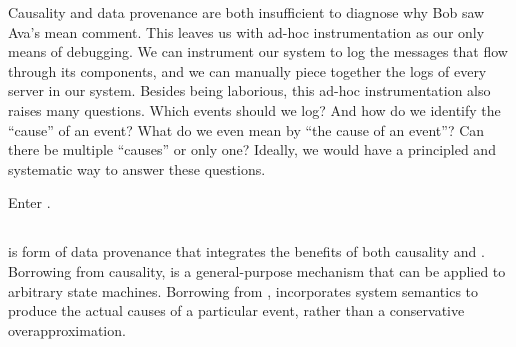 Causality and data provenance are both insufficient to diagnose why Bob saw
Ava's mean comment. This leaves us with ad-hoc instrumentation as our only
means of debugging. We can instrument our system to log the messages that flow
through its components, and we can manually piece together the logs of every
server in our system. Besides being laborious, this ad-hoc instrumentation also
raises many questions. Which events should we log? And how do we identify the
``cause'' of an event? What do we even mean by ``the cause of an event''? Can
there be multiple ``causes'' or only one? Ideally, we would have a principled
and systematic way to answer these questions.

Enter \watprovenance{}. 

%

\subsection{\WatProvenance{}}
\Watprovenance{} is form of data provenance that integrates the benefits of
both causality and \whyprovenance{}. Borrowing from causality, \watprovenance{}
is a general-purpose mechanism that can be applied to arbitrary state machines.
Borrowing from \whyprovenance{}, \watprovenance{} incorporates system semantics
to produce the actual causes of a particular event, rather than a conservative
overapproximation.

